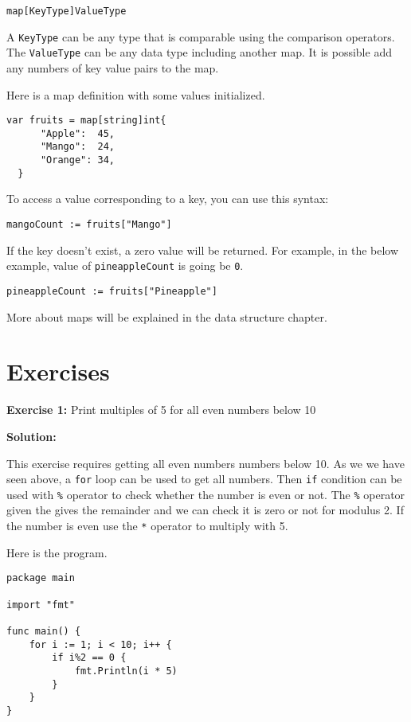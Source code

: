 \begin{lstlisting}[numbers=none]
map[KeyType]ValueType
\end{lstlisting}

A \texttt{KeyType} can be any type that is comparable using the
comparison operators.  The \texttt{ValueType} can be any data type
including another map.  It is possible add any numbers of key value
pairs to the map.

Here is a map definition with some values initialized.

\begin{lstlisting}[numbers=none]
var fruits = map[string]int{
      "Apple":  45,
      "Mango":  24,
      "Orange": 34,
  }
\end{lstlisting}

To access a value corresponding to a key, you can use this syntax:

\begin{lstlisting}[numbers=none]
mangoCount := fruits["Mango"]
\end{lstlisting}

If the key doesn't exist, a zero value will be returned. For example, in the
below example, value of \texttt{pineappleCount} is going be \texttt{0}.

\begin{lstlisting}[numbers=none]
pineappleCount := fruits["Pineapple"]
\end{lstlisting}

More about maps will be explained in the data structure chapter.

\section{Exercises}

\textbf{Exercise 1:} Print multiples of 5 for all even numbers below 10

\textbf{Solution:}

This exercise requires getting all even numbers numbers below 10.  As
we we have seen above, a \texttt{for} loop can be used to get all
numbers.  Then \texttt{if} condition can be used with \texttt{\%}
operator to check whether the number is even or not.  The \texttt{\%}
operator given the gives the remainder and we can check it is zero or
not for modulus 2.  If the number is even use the \texttt{*} operator
to multiply with 5.

Here is the program.

\begin{lstlisting}[numbers=none]
package main

import "fmt"

func main() {
    for i := 1; i < 10; i++ {
        if i%2 == 0 {
            fmt.Println(i * 5)
        }
    }
}
\end{lstlisting}

